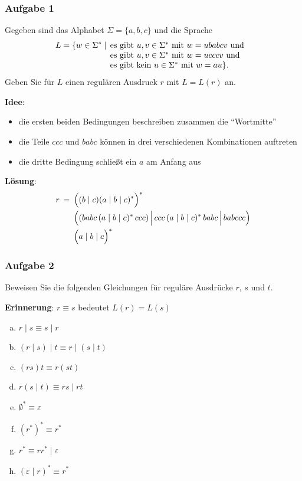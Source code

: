 \documentclass{beamer}
\newcommand{\bigmid}{\,\Big|\,}
\begin{document}
	\begin{frame} \frametitle{Aufgabe 1}
		\small
		Gegeben sind das Alphabet $\Sigma=\{a,b,c\}$ und die Sprache
		\begin{equation*}
			L= \{w\in \Sigma^\ast \mid
			\begin{array}[t]{@{\,}l}
				\mbox{es gibt } u,v\in \Sigma^\ast \mbox{
					mit } w = u babc v \mbox{ und }\\
				\mbox{es gibt } u,v\in \Sigma^\ast \mbox{
					mit } w = u ccc v \mbox{ und }\\
				\mbox{es gibt kein } u \in \Sigma^\ast
				\mbox{ mit } w = au\} .
			\end{array}
		\end{equation*}	
		Geben Sie für $L$ einen regulären Ausdruck $r$ mit $L=L(r)$ an.
	\end{frame}

	\begin{frame}
		\small
		\textbf{Idee}: 
		\begin{itemize}
			\item die ersten beiden Bedingungen beschreiben zusammen die \enquote{Wortmitte}
			\item die Teile $ccc$ und $babc$ können in drei verschiedenen Kombinationen auftreten
			\item die dritte Bedingung schließt ein $a$ am Anfang aus
		\end{itemize} 
		\pause
	
		\textbf{Lösung}:
		\begin{align*}
			r \, = \enskip
				&\Big((b \mid c) (a \mid b \mid c)^\ast \Big)^\ast \\
				&\Big( (babc \, (a \mid b \mid c)^\ast \, ccc) 
				\bigmid ccc \, (a \mid b \mid c)^\ast \, babc 
				\bigmid babccc \Big) \\
				&\Big(a \mid b \mid c \Big)^\ast
		\end{align*}
	\end{frame}
	
	\begin{frame} \frametitle{Aufgabe 2}
		\small
		Beweisen Sie die folgenden Gleichungen für reguläre Ausdrücke $r$,
		$s$ und $t$.
		
		\textbf{Erinnerung}: $r\equiv s$ bedeutet $L(r) = L(s)$
		
		\begin{enumerate}[a)]
			\item $r\mid s\equiv s\mid r$
			\item $(r\mid s)\mid t\equiv r\mid (s\mid t)$
			\item $(rs)t\equiv r(st)$
			\item $r(s\mid t)\equiv rs\mid rt$
			\item $\emptyset^\ast\equiv \varepsilon$
			\item $(r^\ast)^\ast\equiv r^\ast$
			\item $r^\ast\equiv rr^\ast\mid \varepsilon$
			\item $(\varepsilon \mid r)^\ast\equiv r^\ast$
		\end{enumerate}
	\end{frame}
\end{document}
